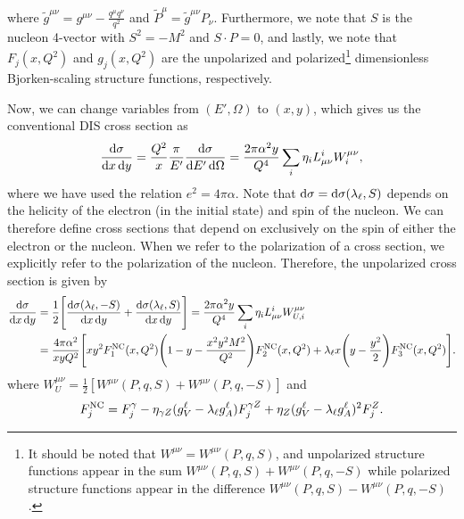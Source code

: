 \documentclass[aps,prd,amsmath,superscriptaddress,floatfix,nofootinbib]{revtex4-2}
\newcommand{\diff}[1]{{\rm d} #1}
\begin{document}
where $\displaystyle \tilde{g}^{\mu\nu} = g^{\mu\nu} - \frac{q^{\mu}q^{\nu}}{q^2}$ and $\tilde{P}^{\mu} = \tilde{g}^{\mu\nu} P_{\nu}$.
Furthermore, we note that $S$ is the nucleon 4-vector with $S^2 = -M^2$ and $S \cdot P = 0$, and lastly, we note that $F_{j}(x,Q^2)$ and $g_{j}(x,Q^2)$ are the unpolarized and polarized\footnote{It should be noted that $W^{\mu\nu} = W^{\mu\nu}(P,q,S)$, and unpolarized structure functions appear in the sum $W^{\mu\nu}(P,q,S) + W^{\mu\nu}(P,q,-S)$ while polarized structure functions appear in the difference $W^{\mu\nu}(P,q,S) - W^{\mu\nu}(P,q,-S)$.} dimensionless Bjorken-scaling structure functions, respectively.

Now, we can change variables from $(E',\Omega)$ to $(x,y)$, which gives us the conventional DIS cross section as
\begin{eqnarray}
\label{eq:xsec-xy}
    \frac{\diff \sigma}{\diff x \, \diff y} = \frac{Q^2}{x} \frac{\pi}{E'} \frac{\diff \sigma}{\diff E' \, \diff \Omega} = \frac{2 \pi \alpha^2 y}{Q^4} \sum_{i} \eta_{i} L_{\mu\nu}^{i}W_{i}^{\mu\nu}
,\end{eqnarray}
where we have used the relation $e^2 = 4\pi\alpha$.
Note that $\diff \sigma = \diff \sigma(\lambda_{\ell}, S)$ depends on the helicity of the electron (in the initial state) and spin of the nucleon.
We can therefore define cross sections that depend on exclusively on the spin of either the electron or the nucleon.
When we refer to the polarization of a cross section, we explicitly refer to the polarization of the nucleon.
Therefore, the unpolarized cross section is given by
\begin{eqnarray}
\label{eq:upol-xsec}
\begin{aligned}    
    \frac{\diff \sigma}{\diff x \, \diff y} &= \frac{1}{2} \Bigg[ \frac{\diff \sigma(\lambda_{\ell},-S)}{\diff x \, \diff y} + \frac{\diff \sigma(\lambda_{\ell},S)}{\diff x \, \diff y} \Bigg] = \frac{2 \pi \alpha^2 y}{Q^{4}} \sum_{i} \eta_{i} L_{\mu\nu}^{i} W^{\mu\nu}_{U,i} \\
                                                &= \frac{4 \pi \alpha^2}{x y Q^2} \Bigg[ xy^2 F_{1}^{\rm NC}(x,Q^2) \Bigg( 1 - y - \frac{x^2 y^2 M^2}{Q^2} \Bigg) F_{2}^{\rm NC}(x,Q^2) + \lambda_{\ell} x \Bigg( y - \frac{y^2}{2} \Bigg) F_{3}^{\rm NC}(x,Q^2) \Bigg]
.\end{aligned}
\end{eqnarray}
where $W^{\mu\nu}_{U} = \frac{1}{2} [ W^{\mu\nu}(P,q,S) + W^{\mu\nu}(P,q,-S) ]$ and 
\begin{eqnarray}
\label{eq:NC-upol-structure-funcs}
    F_{j}^{\rm NC} = F_{j}^{\gamma} - \eta_{\gamma Z} (g_{V}^{\ell} - \lambda_{\ell} g_{A}^{\ell}) F_{j}^{\gamma Z} + \eta_{Z} (g_{V}^{\ell} - \lambda_{\ell} g_{A}^{\ell})^2 F_{j}^{Z}
.\end{eqnarray}
\end{document}
